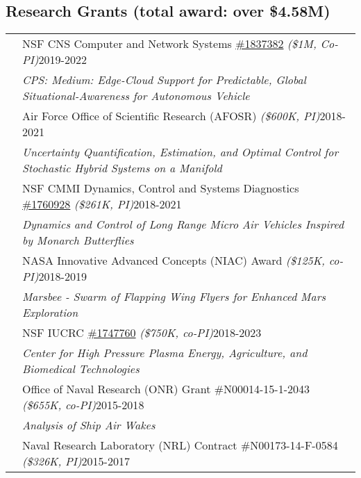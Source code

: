 \documentclass[10pt]{article}
\begin{document}
\subsection*{Research Grants \textnormal{\normalsize (total award: over \$4.58M)}}
\setlength{\tabcolsep}{0cm}
\begin{tabularx}{\textwidth}{>{\setlength{\hsize}{0.5cm}}X X}%
& NSF CNS Computer and Network Systems \href{http://www.nsf.gov/awardsearch/showAward?AWD_ID=1837382}{\#1837382} \textit{(\$1M, Co-PI)}\hfill 2019-2022  \\
& \quad\textit{CPS: Medium: Edge-Cloud Support for Predictable, Global Situational-Awareness for Autonomous Vehicle} \vspace*{0.08cm}\\
%
    & Air Force Office of Scientific Research (AFOSR)  \textit{(\$600K, PI)}\hfill 2018-2021  \\
& \quad\textit{Uncertainty Quantification, Estimation, and Optimal Control for Stochastic Hybrid Systems on a Manifold} \vspace*{0.08cm}\\
%
& NSF CMMI Dynamics, Control and Systems Diagnostics \href{http://www.nsf.gov/awardsearch/showAward?AWD_ID=1760927}{\#1760928} \textit{(\$261K, PI)}\hfill 2018-2021  \\
& \quad\textit{Dynamics and Control of Long Range Micro Air Vehicles Inspired by Monarch Butterflies} \vspace*{0.08cm}\\
%
& NASA Innovative Advanced Concepts (NIAC) Award \textit{(\$125K, co-PI)}\hfill 2018-2019 \\
& \quad\textit{Marsbee - Swarm of Flapping Wing Flyers for Enhanced Mars Exploration} \vspace*{0.08cm}\\
%
& NSF IUCRC \href{https://www.nsf.gov/awardsearch/showAward?AWD_ID=1747760}{\#1747760} \textit{(\$750K, co-PI)}\hfill 2018-2023 \\
& \quad\textit{Center for High Pressure Plasma Energy, Agriculture, and Biomedical Technologies} \vspace*{0.08cm}\\
%     
& Office of Naval Research (ONR) Grant \#N00014-15-1-2043 \textit{(\$655K, co-PI)}\hfill 2015-2018 \\
& \quad\textit{Analysis of Ship Air Wakes} \vspace*{0.08cm}\\
%     
& Naval Research Laboratory (NRL) Contract \#N00173-14-F-0584 \textit{(\$326K, PI)}\hfill 2015-2017 \\

\end{tabularx}
\end{document}
